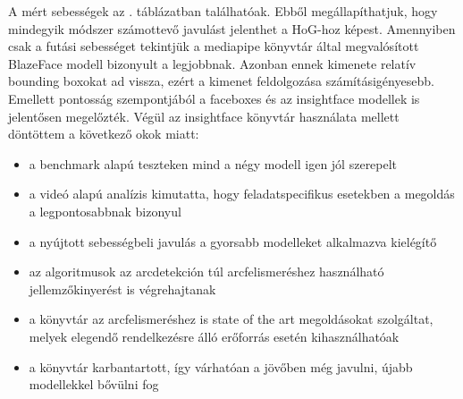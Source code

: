 A mért sebességek az
. táblázatban találhatóak. Ebből megállapíthatjuk, hogy mindegyik módszer számottevő javulást jelenthet a HoG-hoz képest. Amennyiben csak a futási sebességet tekintjük a mediapipe könyvtár által megvalósított BlazeFace modell bizonyult a legjobbnak. Azonban ennek kimenete relatív bounding boxokat ad vissza, ezért a kimenet feldolgozása számításigényesebb. Emellett pontosság szempontjából a faceboxes és az insightface modellek is jelentősen megelőzték. Végül az insightface könyvtár használata mellett döntöttem a következő okok miatt:

\begin{itemize}
    \item a benchmark alapú teszteken mind a négy modell igen jól szerepelt
    \item a videó alapú analízis kimutatta, hogy feladatspecifikus esetekben a megoldás a legpontosabbnak bizonyul
    \item a nyújtott sebességbeli javulás a gyorsabb modelleket alkalmazva kielégítő
    \item az algoritmusok az arcdetekción túl arcfelismeréshez használható jellemzőkinyerést is végrehajtanak
    \item a könyvtár az arcfelismeréshez is state of the art megoldásokat szolgáltat, melyek elegendő rendelkezésre álló erőforrás esetén kihasználhatóak
    \item a könyvtár karbantartott, így várhatóan a jövőben még javulni, újabb modellekkel bővülni fog
\end{itemize}

